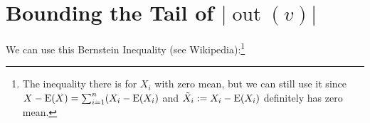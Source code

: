 \documentclass{patmorin}
\DeclareMathOperator{\outn}{out}
\begin{document}
%
%
%
%
%
%
%







\appendix

\section{Bounding the Tail of \texorpdfstring{\boldmath$|\outn(v)|$}{out(v)}}

We can use this Bernstein Inequality (see Wikipedia):\footnote{The inequality there is for $X_i$ with zero mean, but we can still use it since $X-\mathrm{E}(X)=\sum_{i=1}^n (X_i-\mathrm{E}(X_i)$ and $\tilde{X}_i:=X_i-\mathrm{E}(X_i)$ definitely has zero mean.}
\end{document}
